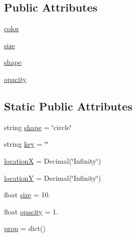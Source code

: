 \subsection*{Public Attributes}
\begin{DoxyCompactItemize}
\item 
\mbox{\hyperlink{classbridges_1_1element__visualizer_1_1_element_visualizer_a1fd985698e1c56289ed49fa7849d43ab}{color}}
\item 
\mbox{\hyperlink{classbridges_1_1element__visualizer_1_1_element_visualizer_a375c56195d1c86d3a658e923be40cb71}{size}}
\item 
\mbox{\hyperlink{classbridges_1_1element__visualizer_1_1_element_visualizer_ac655e0c61496bf47e2f4205c2ebd103b}{shape}}
\item 
\mbox{\hyperlink{classbridges_1_1element__visualizer_1_1_element_visualizer_a160c08f654cdff1112196debae3f3986}{opacity}}
\end{DoxyCompactItemize}
\subsection*{Static Public Attributes}
\begin{DoxyCompactItemize}
\item 
string \mbox{\hyperlink{classbridges_1_1element__visualizer_1_1_element_visualizer_a6db873bf17053c96b54a5ad98763a2c3}{shape}} = \char`\"{}circle\char`\"{}
\item 
string \mbox{\hyperlink{classbridges_1_1element__visualizer_1_1_element_visualizer_add49bfbc846d29a7f09a2369f10efdd1}{key}} = \char`\"{}\char`\"{}
\item 
\mbox{\hyperlink{classbridges_1_1element__visualizer_1_1_element_visualizer_a354cfdfde667847d9c1eb1da9a845c3d}{locationX}} = Decimal(\char`\"{}Infinity\char`\"{})
\item 
\mbox{\hyperlink{classbridges_1_1element__visualizer_1_1_element_visualizer_a1e40a89dd4929f695b47b254bb225786}{locationY}} = Decimal(\char`\"{}Infinity\char`\"{})
\item 
float \mbox{\hyperlink{classbridges_1_1element__visualizer_1_1_element_visualizer_ad8effb64ea33382a723c2c4948048d17}{size}} = 10.
\item 
float \mbox{\hyperlink{classbridges_1_1element__visualizer_1_1_element_visualizer_add8eebf4bece910f0d6899fedd71b139}{opacity}} = 1.
\item 
\mbox{\hyperlink{classbridges_1_1element__visualizer_1_1_element_visualizer_ac60ae1b3b3668b03dc4017e0ba4a199b}{prop}} = dict()
\end{DoxyCompactItemize}


